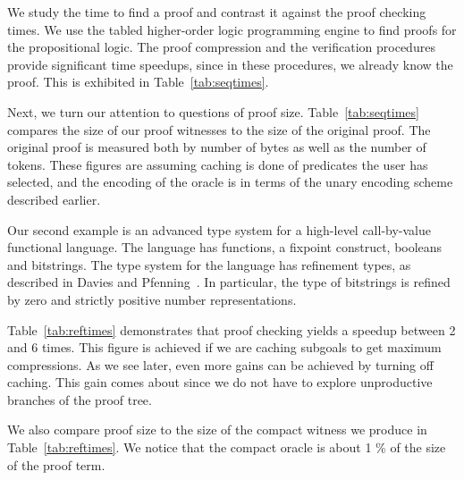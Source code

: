 \documentclass{llncs}
\begin{document}
We study the time to find a proof and contrast it against the proof
checking times. We use the tabled higher-order logic programming
engine \cite{Pientka05,Pientka03phd} to find proofs for the
propositional logic. The proof compression and the verification procedures
provide significant time speedups, since in these procedures, we already
know the proof. This is exhibited in Table~\ref{tab:seqtimes}.

Next, we turn our attention to questions of proof size. 
Table~\ref{tab:seqtimes} compares the size of our proof witnesses to the
size of the original proof. The original proof is measured both by number 
of bytes as well as the number of tokens. These figures are assuming 
caching is done of predicates the user has selected, and the encoding of
the oracle is in terms of the unary encoding scheme described earlier.

Our second example is an advanced type system for a high-level
call-by-value functional language. The language has functions, a
fixpoint construct, booleans and bitstrings. The type system for the
language has refinement types, as described in Davies and
Pfenning~\cite{davies+:intersection}. In particular, the type of
bitstrings is refined by zero and strictly positive number
representations.

Table~\ref{tab:reftimes} demonstrates that proof checking yields a
speedup between 2 and 6 times. This figure is achieved if we are caching
subgoals to get maximum compressions. As we see later, even more gains
can be achieved by turning off caching. 
This gain comes about since we do not have to explore unproductive
branches of the proof tree.

We also compare proof size to the size of the compact witness we
produce in Table~\ref{tab:reftimes}. We notice that the compact oracle
is about 1 \% of the size of the proof term.
\end{document}
